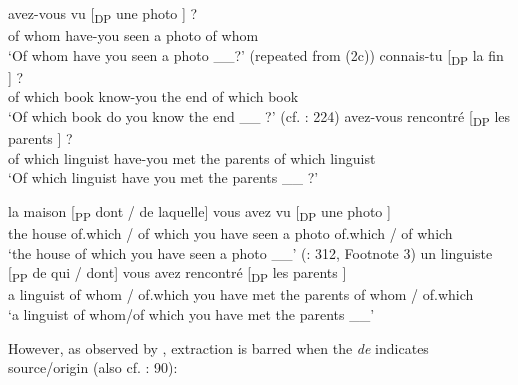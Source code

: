 \documentclass[output=paper]{langsci/langscibook}
\begin{document}
\ea%
    \label{ex:mensch:5}
    \ea
    \gll {}  avez-vous vu [\textsubscript{DP}  une  photo \soutp{[\textsubscript{PP}}{2}    \soute{qui]}] ?\\
      {}   of  whom  have-you seen {}  a  photo {}   of  whom \\
    \glt ‘Of whom have you seen a photo \_\_?’ (repeated from (2c))
    \ex  
    \gll {}  connais-tu [\textsubscript{DP}  la  fin \soutp{[\textsubscript{PP}}{2}    \soute{livre]}] ?\\
    {}     of  which  book  know-you {}  the   end {}  of which book\\
    \glt ‘Of which book do you know the end \_\_ ?’ (cf. \citealt{Sportiche1981}: 224)
    \ex  
    \gll {}   avez-vous  rencontré [\textsubscript{DP}  les parents \soutp{[\textsubscript{PP}}{2}     \soute{linguiste]}] ?\\
      {}   of which linguist  have-you  met {}  the parents {}  of which linguist\\
    \glt ‘Of which linguist have you met the parents \_\_ ?’
    \z
\z


\ea%
    \label{ex:mensch:6}
    \ea
    \gll la  maison  [\textsubscript{PP} dont / de laquelle]  vous avez  vu  [\textsubscript{DP}  une      photo \soutp{[\textsubscript{PP}}{2}    \soute{laquelle]}]\\
         the  house  {}  of.which /  of which     you have  seen {}   a      photo {}  of.which / of which\\
    \glt ‘the house of which you have seen a photo \_\_’  (\citealt{Grosu1974}: 312, Footnote 3)
    \ex  
    \gll un   linguiste [\textsubscript{PP}  de qui / dont]    vous  avez  rencontré [\textsubscript{DP}  les parents \soutp{[\textsubscript{PP}}{2}    \soute{dont]}]\\
         a  linguist {}  of whom / of.which  you  have  met {}    the     parents {}  of whom / of.which\\
    \glt ‘a linguist of whom/of which you have met the parents \_\_’  \citep[90]{Tellier1991}
    \z
\z

However, as observed by \citet[225]{Sportiche1981}, extraction is barred when the  \textit{de} indicates source/origin (also cf. \citealt{Tellier1991}: 90):
\end{document}
